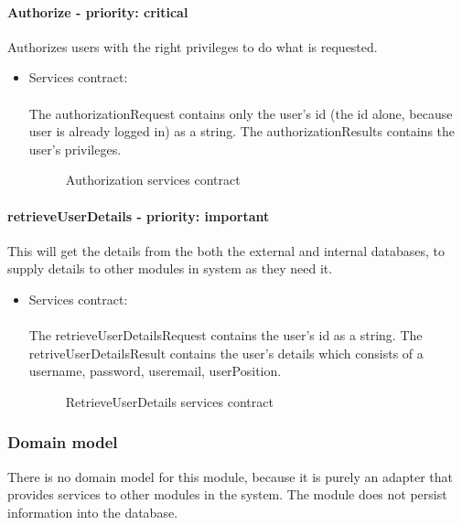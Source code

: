 \paragraph{Authorize - priority: critical}
Authorizes users with the right privileges to do what is requested.
\begin{itemize}
	\item Services contract:\\ \\
	The authorizationRequest contains only the user's id (the id alone, because user is already logged in) as a string. The authorizationResults contains the user's privileges.
	\begin{figure}[H]
    	\centering
    	\caption{Authorization services contract}
    	\label{fig:Authorization_services_contract}
   	\end{figure}
\end{itemize}

\paragraph{retrieveUserDetails - priority: important}
This will get the details from the both the external and internal databases, to supply details to other modules in system as they need it.
\begin{itemize}
	\item Services contract:\\ \\
	The retrieveUserDetailsRequest contains the user's id as a string. The retriveUserDetailsResult contains the user's details which consists of a username, password, useremail, userPosition.
	\begin{figure}[H]
    	\centering
    	\caption{RetrieveUserDetails services contract}
    	\label{fig:RetrieveUserDetails_services_contract}
   	\end{figure}
\end{itemize}

\subsubsection{Domain model}
There is no domain model for this module, because it is purely an adapter that provides services to other modules in the system. The module does not persist information into the database.

